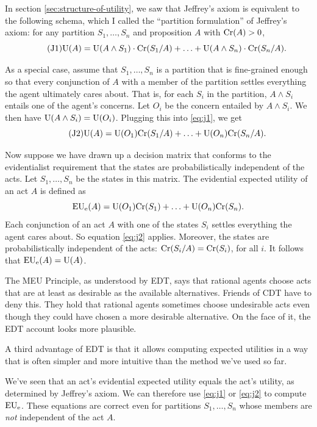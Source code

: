 In section \ref{sec:structure-of-utility}, we saw that Jeffrey's axiom is
equivalent to the following schema, which I called the ``partition formulation''
of Jeffrey's axiom: for any partition $S_{1},\ldots,S_{n}$ and proposition $A$
with $\text{Cr}(A) > 0$,
\begin{equation}\tag{J1}\label{eq:j1}
  \text{U}(A) = \text{U}(A \land S_1)\cdot \text{Cr}(S_{1}/A) + \ldots + \text{U}(A \land S_{n})\cdot\text{Cr}(S_{n}/A).
\end{equation}

As a special case, assume that $S_{1},\ldots,S_{n}$ is a partition that is
fine-grained enough so that every conjunction of $A$ with a member of the
partition settles everything the agent ultimately cares about. That is, for each
$S_{i}$ in the partition, $A \land S_{i}$ entails one of the agent's concerns.
Let $O_{i}$ be the concern entailed by $A \land S_{i}$. We then have
$\text{U}(A \land S_{i}) = \text{U}(O_{i})$. Plugging this into \eqref{eq:j1}, we
get
\begin{equation}\tag{J2}\label{eq:j2}
  \text{U}(A) = \text{U}(O_{1})\text{Cr}(S_{1}/A) + \ldots +\text{U}(O_{n})\text{Cr}(S_{n}/A).
\end{equation}

Now suppose we have drawn up a decision matrix that conforms to the
evidentialist requirement that the states are probabilistically independent of
the acts. Let $S_{1},\ldots,S_{n}$ be the states in this matrix. The evidential
expected utility of an act $A$ is defined as
\[
  \text{EU}_\text{e}(A) = \text{U}(O_{1})\text{Cr}(S_{1}) + \ldots + \text{U}(O_{n})\text{Cr}(S_{n}).
\]
Each conjunction of an act $A$ with one of the states $S_{i}$ settles everything
the agent cares about. So equation \eqref{eq:j2} applies. Moreover, the states
are probabilistically independent of the acts: $\text{Cr}(S_{i}/A) = \text{Cr}(S_{i})$, for
all $i$. It follows that $\text{EU}_\text{e}(A) = \text{U}(A)$.

The MEU Principle, as understood by EDT, says that rational agents choose acts
that are at least as desirable as the available alternatives. Friends of CDT
have to deny this. They hold that rational agents sometimes choose undesirable
acts even though they could have chosen a more desirable alternative. On the
face of it, the EDT account looks more plausible.

A third advantage of EDT is that it allows computing expected utilities in a way
that is often simpler and more intuitive than the method we've used so far.

We've seen that an act's evidential expected utility equals the act's utility,
as determined by Jeffrey's axiom. We can therefore use \eqref{eq:j1} or
\eqref{eq:j2} to compute $\text{EU}_\text{e}$. These equations are correct even for
partitions $S_{1},\ldots,S_{n}$ whose members are \emph{not} independent of the
act $A$.

